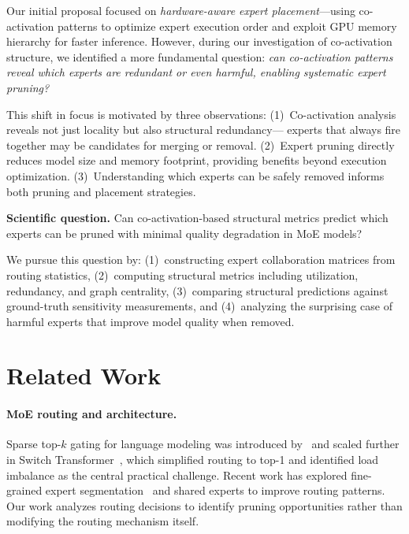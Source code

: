 \documentclass{article}
\begin{document}
Our initial proposal focused on \emph{hardware-aware expert
placement}---using co-activation patterns to optimize expert execution order and
exploit GPU memory hierarchy for faster inference.
However, during our investigation of co-activation structure, we identified a more
fundamental question: \emph{can co-activation patterns reveal which experts are
redundant or even harmful, enabling systematic expert pruning?}

This shift in focus is motivated by three observations:
(1)~Co-activation analysis reveals not just locality but also structural redundancy---
experts that always fire together may be candidates for merging or removal.
(2)~Expert pruning directly reduces model size and memory footprint, providing
benefits beyond execution optimization.
(3)~Understanding which experts can be safely removed informs both pruning and
placement strategies.

\textbf{Scientific question.}
Can co-activation-based structural metrics predict which experts can be pruned
with minimal quality degradation in MoE models?

We pursue this question by: (1)~constructing expert collaboration matrices from
routing statistics, (2)~computing structural metrics including utilization,
redundancy, and graph centrality, (3)~comparing structural predictions against
ground-truth sensitivity measurements, and (4)~analyzing the surprising case of
harmful experts that improve model quality when removed.

\section{Related Work}

\paragraph{MoE routing and architecture.}
Sparse top-$k$ gating for language modeling was introduced by~\citet{shazeer2017outrageously}
and scaled further in Switch Transformer~\citep{fedus2022switch}, which simplified
routing to top-1 and identified load imbalance as the central practical challenge.
Recent work has explored fine-grained expert segmentation~\citep{deepseek2024} and
shared experts to improve routing patterns.
Our work analyzes routing decisions to identify pruning opportunities rather than
modifying the routing mechanism itself.
\end{document}
